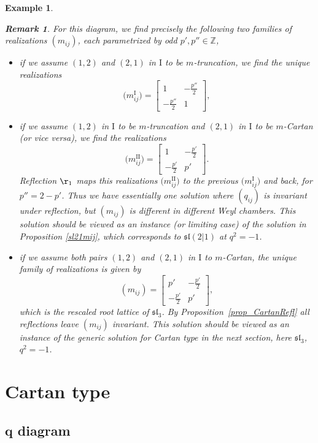 \documentclass[10pt,a4paper]{amsart}
\numberwithin{equation}{section}
\newtheorem{ese}[teo]{Example}
\newtheorem{oss}[teo]{Remark} }
\newcommand{\Z}{\mathbb{Z}}
\begin{document}
\begin{ese}
\begin{oss}
For this diagram, we find precisely the following two families of realizations $(m_{ij})$, each parametrized by odd $p',p'' \in \Z$,
\begin{itemize}\itemsep=0pt
	\item if we assume $(1,2)$ and $(2,1)$ in $\mathrm{I}$ to be $m$-truncation, we find the unique realizations
	\[
	 \big(m_{ij}^{\mathrm{I}}\big)= \begin{bmatrix}
 1 & -\frac{p''}{2}\\
 -\frac{p''}{2} & 1
\end{bmatrix},\]
	\item if we assume $(1,2)$ in $\mathrm{I}$ to be $m$-truncation and $(2,1)$ in $\mathrm{I}$ to be $m$-Cartan (or vice versa), we find the realizations
 \[
	\big(m_{ij}^{\mathrm{II}}\big)= \begin{bmatrix}
 1 & -\frac{p'}{2}\\
 -\frac{p'}{2} & p'
\end{bmatrix}.
\]
Reflection $\r_1$ maps this realizations $\big(m_{ij}^{\mathrm{II}}\big)$ to the previous $\big(m_{ij}^{\mathrm{I}}\big)$ and back, for $p''=2-p'$. Thus we have essentially one solution where $(q_{ij})$ is invariant under reflection, but $(m_{ij})$ is different in different Weyl chambers.
This solution should be viewed as an instance (or limiting case) of the solution in Proposition \ref{sl21mij}, which corresponds to $\mathfrak{sl}(2|1)$ at $q^2=-1$.
\item if we assume both pairs $(1,2)$ and $(2,1)$ in $\mathrm{I}$ to $m$-Cartan, the unique family of realizations is given by
 \[(m_{ij})= \begin{bmatrix}
 p' & -\frac{p'}{2}\\
 -\frac{p'}{2} & p'
\end{bmatrix}, \]
which is the rescaled root lattice of $\mathfrak{sl}_3$. By Proposition~\ref{prop_CartanRefl} all reflections leave $(m_{ij})$ invariant. This solution should be viewed as an instance of the generic solution for Cartan type in the next section, here $\mathfrak{sl}_3$, $q^2=-1$.
\end{itemize}
\end{oss}
\end{ese}

\section{Cartan type}\label{Cartan}
\subsection[$q$ diagram]{$\boldsymbol{q}$ diagram}\label{Cartanconse}
\end{document}
